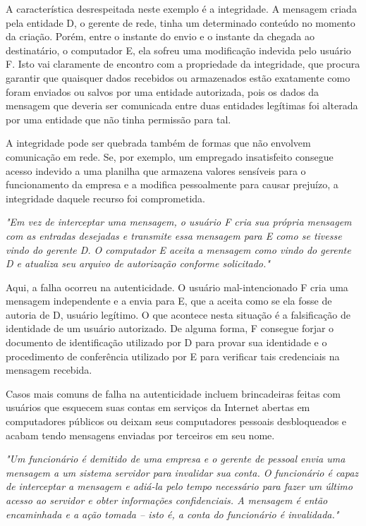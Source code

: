 \documentclass[
	10pt,				%
	openright,			%
	twoside,			%
	a5paper,			%
	english,			%
	french,				%
	spanish,			%
	brazil,				%
	sumario=tradicional
]{abntex2}
\begin{document}
A característica desrespeitada neste exemplo é a integridade. A mensagem criada pela entidade D, o gerente de rede, tinha um determinado conteúdo no momento da criação. Porém, entre o instante do envio e o instante da chegada ao destinatário, o computador E, ela sofreu uma modificação indevida pelo usuário F. Isto vai claramente de encontro com a propriedade da integridade, que procura garantir que quaisquer dados recebidos ou armazenados estão exatamente como foram enviados ou salvos por uma entidade autorizada, pois os dados da mensagem que deveria ser comunicada entre duas entidades legítimas foi alterada por uma entidade que não tinha permissão para tal.

A integridade pode ser quebrada também de formas que não envolvem comunicação em rede. Se, por exemplo, um empregado insatisfeito consegue acesso indevido a uma planilha que armazena valores sensíveis para o funcionamento da empresa e a modifica pessoalmente para causar prejuízo, a integridade daquele recurso foi comprometida.

\textit{"Em vez de interceptar uma mensagem, o usuário F cria sua própria mensagem com as entradas desejadas e transmite essa mensagem para E como se tivesse vindo do gerente D. O computador E aceita a mensagem como vindo do gerente D e atualiza seu arquivo de autorização conforme solicitado."}

Aqui, a falha ocorreu na autenticidade. O usuário mal-intencionado F cria uma mensagem independente e a envia para E, que a aceita como se ela fosse de autoria de D, usuário legítimo. O que acontece nesta situação é a falsificação de identidade de um usuário autorizado. De alguma forma, F consegue forjar o documento de identificação utilizado por D para provar sua identidade e o procedimento de conferência utilizado por E para verificar tais credenciais na mensagem recebida.

Casos mais comuns de falha na autenticidade incluem brincadeiras feitas com usuários que esquecem suas contas em serviços da Internet abertas em computadores públicos ou deixam seus computadores pessoais desbloqueados e acabam tendo mensagens enviadas por terceiros em seu nome.

\textit{"Um funcionário é demitido de uma empresa e o gerente de pessoal envia uma mensagem a um sistema servidor para invalidar sua conta. O funcionário é capaz de interceptar a mensagem e adiá-la pelo tempo necessário para fazer um último acesso ao servidor e obter informações confidenciais. A mensagem é então encaminhada e a ação tomada -- isto é, a conta do funcionário é invalidada."}
\end{document}
